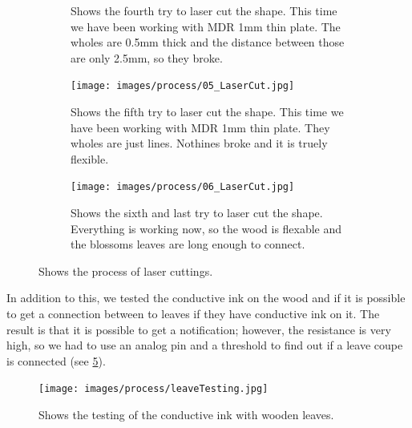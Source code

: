 \documentclass[doc.tex]{subfiles}
\begin{document}
\begin{figure}[H]
\begin{subfigure}{.45\textwidth}
            \caption{Shows the fourth try to laser cut the shape. This time we have been
                    working with MDR 1mm thin plate. The wholes are 0.5mm thick and the 
                    distance between those are only 2.5mm, so they broke.}
            \label{fig:04_LaserCut}
            \vspace{6mm}
        \end{subfigure}
        \hspace{1mm}
        \begin{subfigure}{.45\textwidth}
            \centering
            \texttt{[image: images/process/05\_LaserCut.jpg]}
            \caption{Shows the fifth try to laser cut the shape. This time we have been
                    working with MDR 1mm thin plate. They wholes are just lines. Nothines
                    broke and it is truely flexible.}
            \label{fig:04_LaserCut}
            \vspace{6mm}
        \end{subfigure}
        \hspace{1mm}
        \begin{subfigure}{.45\textwidth}
            \centering
            \texttt{[image: images/process/06\_LaserCut.jpg]}
            \caption{Shows the sixth and last try to laser cut the shape. Everything is 
            working now, so the wood is flexable and the blossoms leaves are long enough
            to connect. }
            \label{fig:04_LaserCut}
            \vspace{6mm}
        \end{subfigure}
        \caption{Shows the process of laser cuttings.}
        \label{fig:laserCutTests}
    \end{figure}

    \noindent
    In addition to this, we tested the conductive ink on the wood and if it is possible 
    to get a connection between to leaves if they have conductive ink on it. The result is
    that it is possible to get a notification; however, the resistance is very high, so we 
    had to use an analog pin and a threshold to find out if a leave coupe is connected
    (see \ref{fig:leaveConductiveInk}).

    \begin{figure}[h!]
        \centering
        \texttt{[image: images/process/leaveTesting.jpg]}
        \caption{Shows the testing of the conductive ink with wooden leaves.}
        \label{fig:leaveConductiveInk}
    \end{figure}
\end{document}
